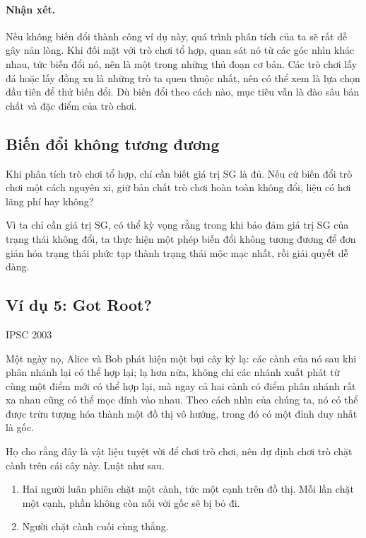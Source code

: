 \documentclass[11pt]{article}
\begin{document}
\paragraph{Nhận xét.}
Nếu không biến đổi thành công ví dụ này, quá trình phân tích của ta sẽ rất dễ
gây nản lòng. Khi đối mặt với trò chơi tổ hợp, quan sát nó từ các góc nhìn khác
nhau, tức biến đổi nó, nên là một trong những thủ đoạn cơ bản. Các trò chơi
lấy đá hoặc lấy đồng xu là những trò ta quen thuộc nhất, nên có thể xem là lựa
chọn đầu tiên để thử biến đổi. Dù biến đổi theo cách nào, mục tiêu vẫn là đào
sâu bản chất và đặc điểm của trò chơi.

\subsection{Biến đổi không tương đương}

Khi phân tích trò chơi tổ hợp, chỉ cần biết giá trị SG là đủ. Nếu cứ biến đổi
trò chơi một cách nguyên xi, giữ bản chất trò chơi hoàn toàn không đổi, liệu
có hơi lãng phí hay không?

Vì ta chỉ cần giá trị SG, có thể kỳ vọng rằng trong khi bảo đảm giá trị SG của
trạng thái không đổi, ta thực hiện một phép biến đổi không tương đương để đơn
giản hóa trạng thái phức tạp thành trạng thái mộc mạc nhất, rồi giải quyết dễ
dàng.

\subsection*{Ví dụ 5: Got Root?}

\begin{center}
IPSC 2003
\end{center}

Một ngày nọ, Alice và Bob phát hiện một bụi cây kỳ lạ: các cành của nó sau khi
phân nhánh lại có thể hợp lại; lạ hơn nữa, không chỉ các nhánh xuất phát từ
cùng một điểm mới có thể hợp lại, mà ngay cả hai cành có điểm phân nhánh rất
xa nhau cũng có thể mọc dính vào nhau. Theo cách nhìn của chúng ta, nó có thể
được trừu tượng hóa thành một đồ thị vô hướng, trong đó có một đỉnh duy nhất
là gốc.

Họ cho rằng đây là vật liệu tuyệt vời để chơi trò chơi, nên dự định chơi trò
chặt cành trên cái cây này. Luật như sau.

\begin{enumerate}
  \item Hai người luân phiên chặt một cành, tức một cạnh trên đồ thị. Mỗi lần
  chặt một cạnh, phần không còn nối với gốc sẽ bị bỏ đi.
  \item Người chặt cành cuối cùng thắng.
\end{enumerate}
\end{document}
